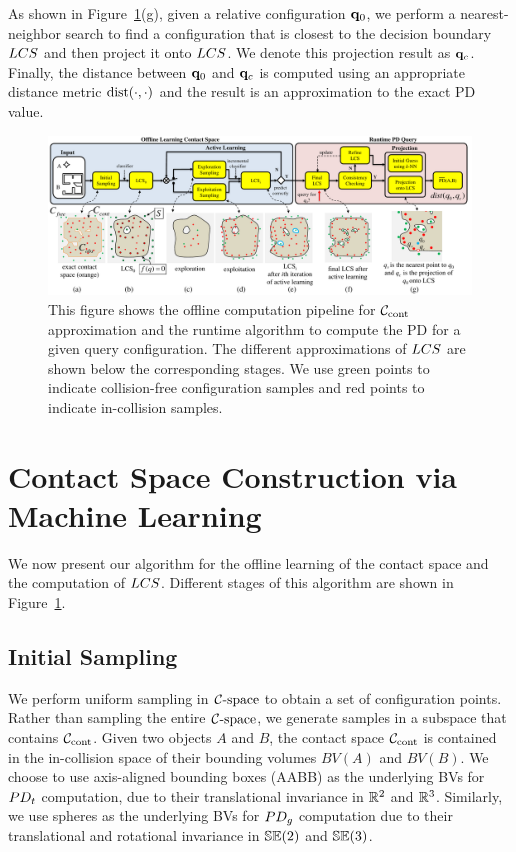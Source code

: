 As shown in Figure~\ref{fig:2:pipeline}(g), given a relative configuration $\mathbf q_0$, we perform
a nearest-neighbor search to find a configuration that is closest to the decision boundary $LCS$ and then project it
onto $LCS$. We denote this projection result as $\mathbf q_c$.
Finally, the distance between $\mathbf q_0$ and $\mathbf q_c$ is computed using an appropriate distance metric $\operatorname{dist}(\cdot, \cdot)$ and the result is an approximation to the exact PD value.


\begin{figure}[!htb]
  \centering
  \includegraphics[width=\linewidth]{figs/2/pipeline.pdf}
  \caption[Offline computation pipeline for $\Ccont$ approximation and the runtime algorithm to compute the PD for a given query configuration]{This figure shows the offline computation pipeline for $\Ccont$ approximation and the runtime algorithm to compute the PD for a given query configuration. The different approximations of $LCS$ are shown below the corresponding stages. We use green points to indicate collision-free configuration samples and red points to indicate in-collision samples.}
  \label{fig:2:pipeline}
\end{figure}

\section{Contact Space Construction via Machine Learning}
\label{sec:2:learning}
We now present our algorithm for the offline learning of the contact space and the computation of $LCS$. Different stages of this algorithm
are shown in Figure~\ref{fig:2:pipeline}.

\subsection{Initial Sampling}
\label{sec:2:offline:uniform}

We perform uniform sampling in $\mathcal C\text{-space}$ to obtain a set of configuration points. Rather than sampling the entire $\mathcal C\text{-space}$,
we generate samples in a subspace that contains $\Ccont$. Given two objects $A$ and $B$, the contact space $\Ccont$ is contained in the in-collision space of their bounding volumes $BV(A)$ and $BV(B)$. We choose to use
axis-aligned bounding boxes (AABB) as the underlying BVs for $PD_t$
computation, due to their translational invariance in $\mathbb R^2$
and $\mathbb R^3$. Similarly, we use spheres as the underlying BVs for $PD_g$
computation due to their translational and rotational invariance in
$\mathbb {SE}(2)$ and $\mathbb {SE}(3)$.

